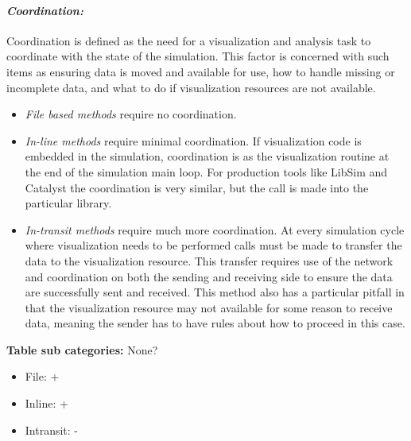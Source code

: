 \paragraph{\emph{Coordination:}}
Coordination is defined as the need for a visualization and analysis task to coordinate with the state of the simulation. This factor is concerned with such items as ensuring data is moved and available for use, how to handle missing or incomplete data, and what to do if visualization resources are not available. 
\begin{itemize}
    \item \emph{File based methods} require no coordination.
    
    \item \emph{In-line methods} require minimal coordination. If visualization code is embedded in the simulation, coordination is as the visualization routine at the end of the simulation main loop. For production tools like LibSim and Catalyst the coordination is very similar, but the call is made into the particular library.
    
    \item \emph{In-transit methods} require much more coordination. At every simulation cycle where visualization needs to be performed calls must be made to transfer the data to the visualization resource. This transfer requires use of the network and coordination on both the sending and receiving side to ensure the data are successfully sent and received. This method also has a particular pitfall in that the visualization resource may not available for some reason to receive data, meaning the sender has to have rules about how to proceed in this case.
\end{itemize}

\textbf{Table sub categories:} None?
\begin{itemize}
    \item File: +
    \item Inline: +
    \item Intransit: -
\end{itemize}

